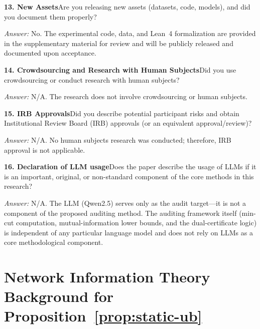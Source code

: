 \documentclass{article}
\begin{document}
\noindent\textbf{13. New Assets}\quad Are you releasing new assets (datasets, code, models), and did you document them properly?

\emph{Answer:} No. The experimental code, data, and Lean~4 formalization are provided in the supplementary material for review and will be publicly released and documented upon acceptance.

\noindent\textbf{14. Crowdsourcing and Research with Human Subjects}\quad Did you use crowdsourcing or conduct research with human subjects?

\emph{Answer:} N/A. The research does not involve crowdsourcing or human subjects.

\noindent\textbf{15. IRB Approvals}\quad Did you describe potential participant risks and obtain Institutional Review Board (IRB) approvals (or an equivalent approval/review)?

\emph{Answer:} N/A. No human subjects research was conducted; therefore, IRB approval is not applicable.

\noindent\textbf{16. Declaration of LLM usage}\quad Does the paper describe the usage of LLMs if it is an important, original, or non-standard component of the core methods in this research?

\emph{Answer:} N/A. The LLM (Qwen2.5) serves only as the audit target---it is not a component of the proposed auditing method. The auditing framework itself (min-cut computation, mutual-information lower bounds, and the dual-certificate logic) is independent of any particular language model and does not rely on LLMs as a core methodological component.

\newpage

\appendix

\section{Network Information Theory Background for Proposition~\ref{prop:static-ub}}
\label{app:netinfo}
\end{document}

